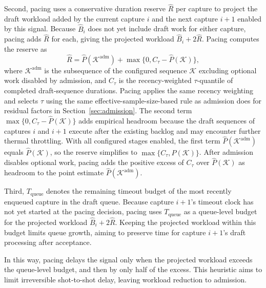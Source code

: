 Second, pacing uses a conservative duration reserve \(\hat R\) per capture to project the draft workload added by the current capture \(i\) and the next capture \(i+1\) enabled by this signal.
Because \(\hat B_i\) does not yet include draft work for either capture, pacing adds \(\hat R\) for each, giving the projected workload \(\hat B_i+2\hat R\).
Pacing computes the reserve as
\begin{equation*}
  \hat R
  =
  \hat P(\mathcal K^{\mathrm{adm}})
  +
  \max\{0,C_\tau-\hat P(\mathcal K)\},
\end{equation*}
where \(\mathcal K^{\mathrm{adm}}\) is the subsequence of the configured sequence \(\mathcal K\) excluding optional work disabled by admission, and \(C_\tau\) is the recency-weighted \(\tau\)-quantile of completed draft-sequence durations.
Pacing applies the same recency weighting and selects \(\tau\) using the same effective-sample-size-based rule as admission does for residual factors in Section~\ref{sec:admission}.
The second term \(\max\{0,C_\tau-\hat P(\mathcal K)\}\) adds empirical headroom because the draft sequences of captures \(i\) and \(i+1\) execute after the existing backlog and may encounter further thermal throttling.
With all configured stages enabled, the first term \(\hat P(\mathcal K^{\mathrm{adm}})\) equals \(\hat P(\mathcal K)\), so the reserve simplifies to \(\max\{C_\tau,\hat P(\mathcal K)\}\).
After admission disables optional work, pacing adds the positive excess of \(C_\tau\) over \(\hat P(\mathcal K)\) as headroom to the point estimate \(\hat P(\mathcal K^{\mathrm{adm}})\).

Third, \(T_{\mathrm{queue}}\) denotes the remaining timeout budget of the most recently enqueued capture in the draft queue.
Because capture \(i+1\)'s timeout clock has not yet started at the pacing decision, pacing uses \(T_{\mathrm{queue}}\) as a queue-level budget for the projected workload \(\hat B_i+2\hat R\).
Keeping the projected workload within this budget limits queue growth, aiming to preserve time for capture \(i+1\)'s draft processing after acceptance.

In this way, pacing delays the signal only when the projected workload exceeds the queue-level budget, and then by only half of the excess.
This heuristic aims to limit irreversible shot-to-shot delay, leaving workload reduction to admission.

